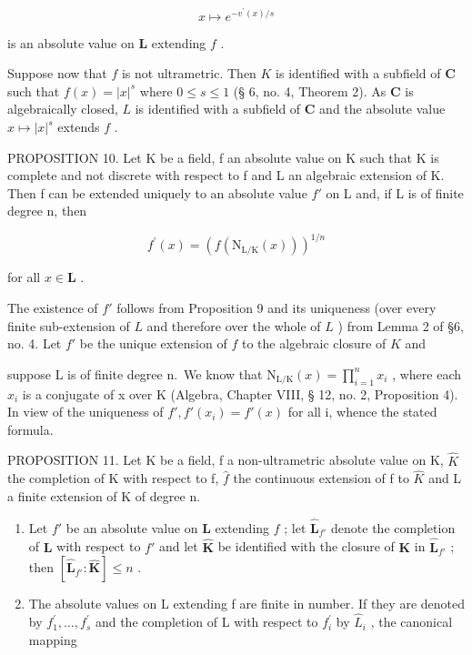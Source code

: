 \[
x \mapsto e ^ {- v ^ {\prime} (x) / s}
\]

is an absolute value on \(\mathbf{L}\) extending \(f\) .

Suppose now that \(f\) is not ultrametric. Then \(K\) is identified with a subfield of \(\mathbf{C}\) such that \(f(x) = |x|^s\) where \(0 \leqslant s \leqslant 1\) (§ 6, no. 4, Theorem 2). As \(\mathbf{C}\) is algebraically closed, \(L\) is identified with a subfield of \(\mathbf{C}\) and the absolute value \(x \mapsto |x|^s\) extends \(f\) .

PROPOSITION 10. Let K be a field, f an absolute value on K such that K is complete and not discrete with respect to f and L an algebraic extension of K. Then f can be extended uniquely to an absolute value \(f'\) on L and, if L is of finite degree n, then

\[
f ^ {\prime} (x) = \left(f (\mathrm{N} _ {\mathrm{L/K}} (x))\right) ^ {1 / n}
\]

for all \(x \in \mathbf{L}\) .

The existence of \(f'\) follows from Proposition 9 and its uniqueness (over every finite sub-extension of \(L\) and therefore over the whole of \(L\) ) from Lemma 2 of §6, no. 4. Let \(f'\) be the unique extension of \(f\) to the algebraic closure of \(K\) and

suppose L is of finite degree n.~We know that \(\mathrm{N}_{\mathrm{L}/\mathrm{K}}(x)=\prod_{i=1}^{n} x_i\) , where each \(x_{i}\) is a conjugate of x over K (Algebra, Chapter VIII, § 12, no. 2, Proposition 4). In view of the uniqueness of \(f', f'(x_{i})=f'(x)\) for all i, whence the stated formula.

PROPOSITION 11. Let K be a field, f a non-ultrametric absolute value on K, \(\hat{K}\) the completion of K with respect to f, \(\hat{f}\) the continuous extension of f to \(\hat{K}\) and L a finite extension of K of degree n.

\begin{enumerate}
\def\labelenumi{(\alph{enumi})}
\item
  Let \(f'\) be an absolute value on \(\mathbf{L}\) extending \(f\) ; let \(\hat{\mathbf{L}}_{f'}\) denote the completion of \(\mathbf{L}\) with respect to \(f'\) and let \(\hat{\mathbf{K}}\) be identified with the closure of \(\mathbf{K}\) in \(\hat{\mathbf{L}}_{f'}\) ; then \([\hat{\mathbf{L}}_{f'}: \hat{\mathbf{K}}] \leqslant n\) .
\item
  The absolute values on L extending f are finite in number. If they are denoted by \(f_{1}^{\prime}, \ldots, f_{s}^{\prime}\) and the completion of L with respect to \(f_{i}^{\prime}\) by \(\hat{L}_{i}\) , the canonical mapping
\end{enumerate}

